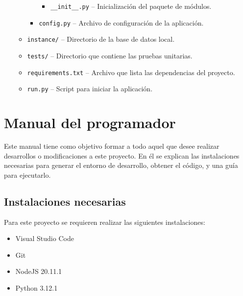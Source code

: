 \begin{itemize}
\begin{itemize}
\begin{itemize}
\begin{itemize}
                \item \texttt{\_\_init\_\_.py} -- Inicialización del paquete de módulos.
            \end{itemize}
            \item \texttt{config.py} -- Archivo de configuración de la aplicación.
        \end{itemize}
        \item \texttt{instance/} -- Directorio de la base de datos local.
        \item \texttt{tests/} -- Directorio que contiene las pruebas unitarias.
        \item \texttt{requirements.txt} -- Archivo que lista las dependencias del proyecto.
        \item \texttt{run.py} -- Script para iniciar la aplicación.
    \end{itemize}
\end{itemize}

\section{Manual del programador}
Este manual tiene como objetivo formar a todo aquel que desee realizar desarrollos o modificaciones a este proyecto. En él se explican las instalaciones necesarias para generar el entorno de desarrollo, obtener el código, y una guía para ejecutarlo.

\subsection{Instalaciones necesarias}
Para este proyecto se requieren realizar las siguientes instalaciones:
\begin{itemize}
    \item Visual Studio Code
    \item Git
    \item NodeJS 20.11.1
    \item Python 3.12.1
\end{itemize}


